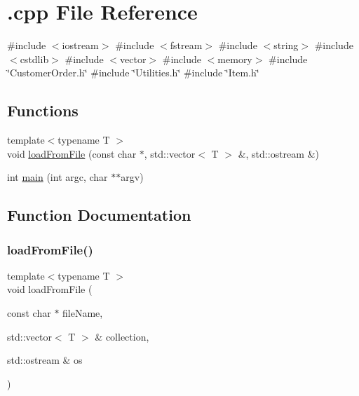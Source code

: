 \hypertarget{_8cpp}{}\section{.cpp File Reference}
\label{_8cpp}
{\ttfamily \#include $<$iostream$>$}\newline
{\ttfamily \#include $<$fstream$>$}\newline
{\ttfamily \#include $<$string$>$}\newline
{\ttfamily \#include $<$cstdlib$>$}\newline
{\ttfamily \#include $<$vector$>$}\newline
{\ttfamily \#include $<$memory$>$}\newline
{\ttfamily \#include \char`\"{}Customer\+Order.\+h\char`\"{}}\newline
{\ttfamily \#include \char`\"{}Utilities.\+h\char`\"{}}\newline
{\ttfamily \#include \char`\"{}Item.\+h\char`\"{}}\newline
\subsection*{Functions}
\begin{DoxyCompactItemize}
\item 
{\footnotesize template$<$typename T $>$ }\\void \mbox{\hyperlink{_8cpp_a720822ee36812c01e9e2559d17233647}{load\+From\+File}} (const char $\ast$, std\+::vector$<$ T $>$ \&, std\+::ostream \&)
\item 
int \mbox{\hyperlink{_8cpp_a3c04138a5bfe5d72780bb7e82a18e627}{main}} (int argc, char $\ast$$\ast$argv)
\end{DoxyCompactItemize}


\subsection{Function Documentation}
\mbox{\label{_8cpp_a720822ee36812c01e9e2559d17233647}} 
\subsubsection{\texorpdfstring{load\+From\+File()}{loadFromFile()}}
{\footnotesize\ttfamily template$<$typename T $>$ \\
void load\+From\+File (\begin{DoxyParamCaption}\item[{const char $\ast$}]{file\+Name,  }\item[{std\+::vector$<$ T $>$ \&}]{collection,  }\item[{std\+::ostream \&}]{os }\end{DoxyParamCaption})}

